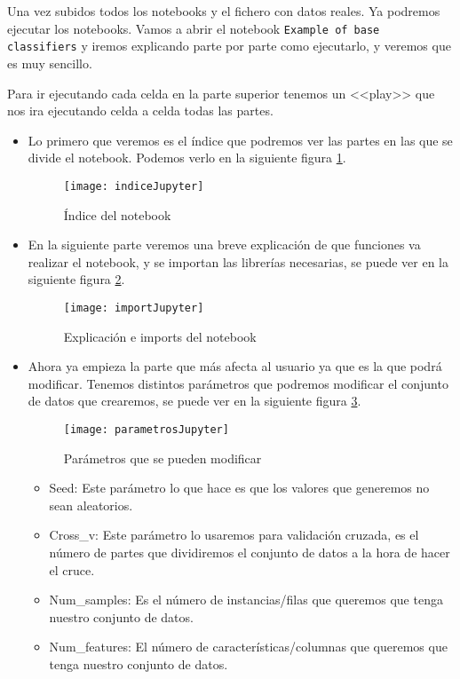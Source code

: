 Una vez subidos todos los notebooks y el fichero con datos reales. Ya podremos ejecutar los notebooks. Vamos a abrir el notebook \texttt{Example of base classifiers} y iremos explicando parte por parte como ejecutarlo, y veremos que es muy sencillo.

Para ir ejecutando cada celda en la parte superior tenemos un <<play>> que nos ira ejecutando celda a celda todas las partes.
\begin{itemize}
	\item Lo primero que veremos es el índice que podremos ver las partes en las que se divide el notebook. Podemos verlo en la siguiente figura \ref{fig:indiceJupyter}.
	\begin{figure}
	\centering
	\texttt{[image: indiceJupyter]}
	\caption{Índice del notebook}
	\label{fig:indiceJupyter}
	\end{figure}
	\item En la siguiente parte veremos una breve explicación de que funciones va realizar el notebook, y se importan las librerías necesarias, se puede ver en la siguiente figura \ref{fig:importJupyter}.
	\begin{figure}
	\centering
	\texttt{[image: importJupyter]}
	\caption{Explicación e imports del notebook}
	\label{fig:importJupyter}
	\end{figure}
	\item Ahora ya empieza la parte que más afecta al usuario ya que es la que podrá modificar. Tenemos distintos parámetros que podremos modificar el conjunto de datos que crearemos, se puede ver en la siguiente figura \ref{fig:parametrosJupyter}.
	\begin{figure}
	\centering
	\texttt{[image: parametrosJupyter]}
	\caption{Parámetros que se pueden modificar}
	\label{fig:parametrosJupyter}
	\end{figure}
	\begin{itemize}
		\item Seed: Este parámetro lo que hace es que los valores que generemos no sean aleatorios.
		\item Cross\_v: Este parámetro lo usaremos para validación cruzada, es el número de partes que dividiremos el conjunto de datos a la hora de hacer el cruce.
		\item Num\_samples: Es el número de instancias/filas que queremos que tenga nuestro conjunto de datos.
		\item Num\_features: El número de características/columnas que queremos que tenga nuestro conjunto de datos.

\end{itemize}
\end{itemize}
